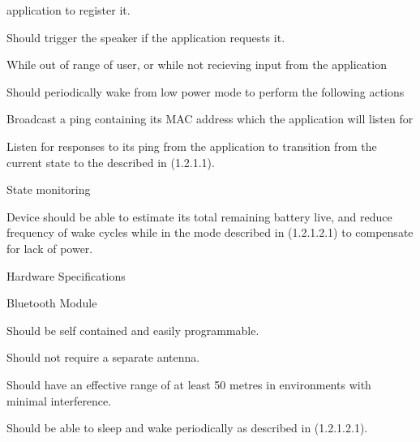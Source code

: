 \documentclass[12pt]{article}
\begin{document}
\begin{packed_enum}
\begin{packed_enum}
\begin{packed_enum}
\begin{packed_enum}
\begin{packed_enum}
                  application to register it.
            \item Should trigger the speaker if the application requests it.
          \end{packed_enum}
          \item While out of range of user, or while not recieving input from
                the application
          \begin{packed_enum}
            \item Should periodically wake from low power mode to perform the 
                  following actions
            \begin{packed_enum}
              \item Broadcast a ping containing its MAC address which the
                    application will listen for
              \item Listen for responses to its ping from the application to
                    transition from the current state to the described in
                    (1.2.1.1).
            \end{packed_enum}
          \end{packed_enum}
        \end{packed_enum}
        \item State monitoring
        \begin{packed_enum}
          \item Device should be able to estimate its total remaining battery
                live, and reduce frequency of wake cycles while in the mode
                described in (1.2.1.2.1) to compensate for lack of power.
        \end{packed_enum}
      \end{packed_enum}
      \item Hardware Specifications
      \begin{packed_enum}
        \item Bluetooth Module
        \begin{packed_enum}
          \item Should be self contained and easily programmable.
          \item Should not require a separate antenna.
          \item Should have an effective range of at least 50 metres in 
                environments with minimal interference.
          \item Should be able to sleep and wake periodically as described in
                (1.2.1.2.1).

\end{packed_enum}
\end{packed_enum}
\end{packed_enum}
\end{packed_enum}
\end{document}
